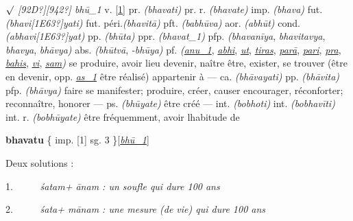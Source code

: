 \documentclass[12pt,twoside]{article}
\begin{document}
\textit{${\surd}$ [92D?][942?] bh\=u\_1} v.
[\href{http://sanskrit.inria.fr/cgi-bin/sktconjug?q=bhuu#1;c=1}{1}]
pr. \textit{(bhavati)} pr. r. \textit{(bhavate)} imp.
\textit{(bhava)} fut. \textit{(bhavi}\textit{[1E63?]}\textit{yati)}
fut. p\'eri.\textit{(bhavit\=a)} pft. \textit{(babh\=uva)} aor.
\textit{(abh\=ut)} cond.
\textit{(abhavi}\textit{[1E63?]}\textit{yat)} pp. \textit{(bh\=uta)}
ppr. \textit{(bhavat\_1)} pfp. \textit{(bhavan\=iya},
\textit{bhavitavya}, \textit{bhavya}, \textit{bh\=avya)} abs.
\textit{(bh\=utv\=a}, \textit{{}-bh\=uya)} pf.
\textit{(}\href{http://sanskrit.inria.fr/DICO/3.html#anubhuu}{\textit{anu\_1}},
\href{http://sanskrit.inria.fr/DICO/5.html#abhibhuu}{\textit{abhi}},
\href{http://sanskrit.inria.fr/DICO/14.html#udbhuu}{\textit{ut}},
\href{http://sanskrit.inria.fr/DICO/29.html#tirobhuu}{\textit{tiras}},
\href{http://sanskrit.inria.fr/DICO/39.html#paraabhuu}{\textit{par\=a}},
\href{http://sanskrit.inria.fr/DICO/39.html#paribhuu}{\textit{pari}},
\href{http://sanskrit.inria.fr/DICO/44.html#prabhuu}{\textit{pra}},
\href{http://sanskrit.inria.fr/DICO/46.html#bahirbhuu}{\textit{bahis}},
\href{http://sanskrit.inria.fr/DICO/60.html#vibhuuf1}{\textit{vi}},
\href{http://sanskrit.inria.fr/DICO/68.html#sambhuu}{\textit{sam}}\textit{)}
se produire, avoir lieu {\textbar} devenir, na\^itre {\textbar}
\^etre, exister, se trouver (\^etre en devenir, opp.
\href{http://sanskrit.inria.fr/DICO/7.html#asf1}{\textit{as\_1}}
\^etre r\'ealis\'e) {\textbar} appartenir \`a {---} ca.
\textit{(bh\=avayati)} pp. \textit{(bh\=avita)} pfp.
\textit{(bh\=avya)} faire se manifester; produire, cr\'eer, causer
{\textbar} encourager, r\'econforter; reconna\^itre, honorer {---}
ps. \textit{(bh\=uyate)} \^etre cr\'e\'e {---} int.
\textit{(bobhoti)} int. \textit{(bobhav\=iti)} int. r.
\textit{(bobh\=uyate)} \^etre fr\'equemment, avoir
l{\textquotesingle}habitude de

\textbf{bhavatu }\{ imp. [1] sg. 3
\}[\href{http://sanskrit.inria.fr/DICO/47.html#bhuuf1}{\textit{bh\=u\_1}}]


\bigskip

Deux solutions :

1.\textup{~~~~~ }\textit{\'satam+ \=anam : un soufle qui dure 100 ans}

2.\textup{~~~~~ }\textit{\'sata+ m\=anam : une mesure (de vie) qui dure
100 ans}


\bigskip
\end{document}

